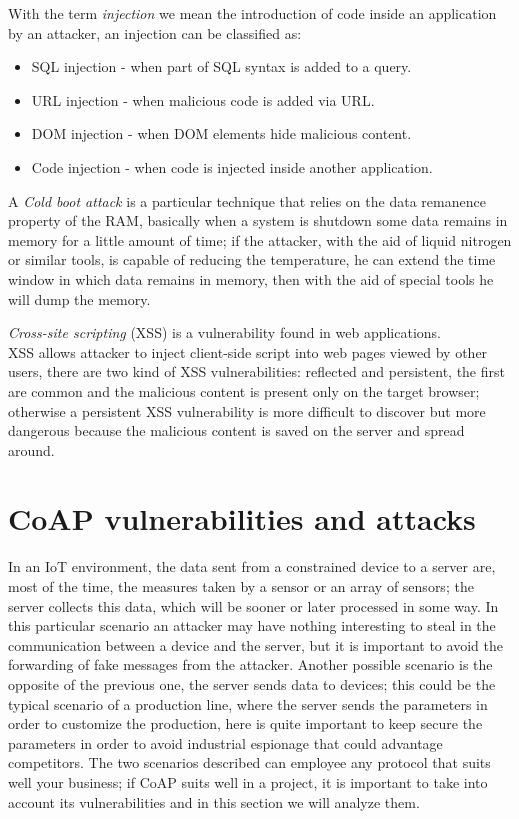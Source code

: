 	With the term \emph{injection} we mean the introduction of code inside an application by an attacker, an injection
	can be classified as:
	\begin{itemize}
		\item SQL injection - when part of SQL syntax is added to a query.
		\item URL injection - when malicious code is added via URL.
		\item DOM injection - when DOM elements hide malicious content.
		\item Code injection - when code is injected inside another application.
	\end{itemize}
	
	A \emph{Cold boot attack} is a particular technique that relies on the data remanence property of the RAM, basically when
	a system is shutdown some data remains in memory for a little amount of time; if the attacker, with the aid of liquid nitrogen or similar tools, is capable of reducing the temperature, he can extend the time window in which data remains in memory, then with the aid of special tools he will dump the memory.\newline
	
	\emph{Cross-site scripting} (XSS) is a vulnerability found in web applications.\\
	XSS allows attacker to inject client-side script into web pages viewed by other users, there are two kind of XSS vulnerabilities:
	reflected and persistent, the first are common and the malicious content is present only on the target browser; otherwise a persistent XSS vulnerability is more difficult to discover but more dangerous because the malicious content is saved on the server and spread around.\\
	
	
	\section{CoAP vulnerabilities and attacks}
	In an IoT environment, the data sent from a constrained device to a server are, most of the time, the measures taken by a sensor or an array of sensors; the server collects this data, which will be sooner or later processed in some way.\newline
	In this particular scenario an attacker may have nothing interesting to steal in the communication between a device and the server, but it is important to avoid the forwarding of fake messages from the attacker.\newline
	Another possible scenario is the opposite of the previous one, the server sends data to devices; this could be the typical scenario of a production line, where the server sends the parameters in order to customize the production, here is quite important to keep secure the parameters in order to avoid industrial espionage that could advantage competitors.\newline
	The two scenarios described can employee any protocol that suits well your business; if CoAP suits well in a project, it is important to take into account its vulnerabilities and in this section we will analyze them.\newline
	
